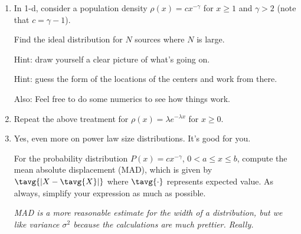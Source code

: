 \begin{enumerate}

   \solutionend


\item In 1-d, consider a population density 
  $\rho(x) = c x^{-\gamma}$ for $x \ge 1$ and $\gamma > 2$
  (note that $c = \gamma-1$).

  Find the ideal distribution for $N$ sources
  where $N$ is large.

  Hint: draw yourself a clear picture of what's going on.

  Hint: guess the form of the locations of the centers
  and work from there.

  Also: Feel free to do some numerics to see how
  things work.

  
   \solutionstart


   \solutionend



\item Repeat the above treatment for
  $\rho(x) = \lambda e^{-\lambda x}$ for $x \ge 0$.  


  
   \solutionstart


   \solutionend


\item
  Yes, even more on power law size distributions.
  It's good for you.
  
  For the probability distribution $P(x) = c x^{-\gamma}$,
  $0 < a \le x \le b$,
  compute the mean absolute displacement (MAD),
  which is given by
  $\tavg{|X - \tavg{X}|}$ where $\tavg{\cdot}$ represents 
  expected value.  As always, simplify your expression
  as much as possible.
  
  \textit{MAD is a more reasonable estimate for the width
    of a distribution, but we like variance $\sigma^{2}$ because
    the calculations are much prettier.  Really.}

  
   \solutionstart


\end{enumerate}
